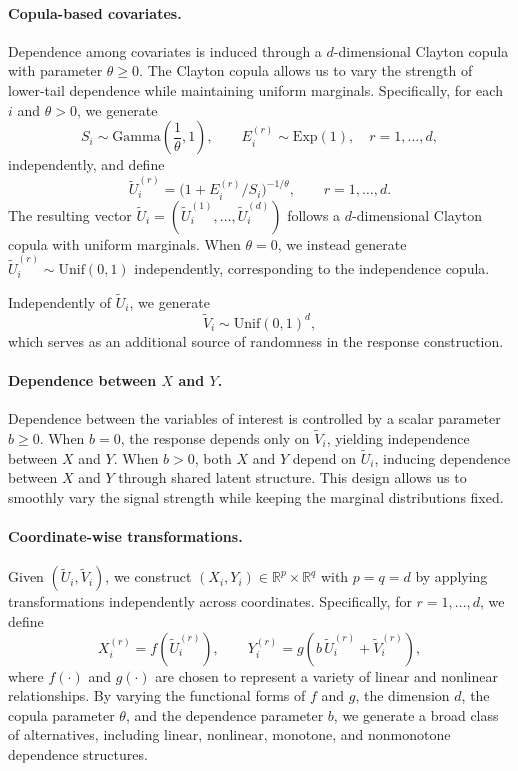 \documentclass[12pt,reqno,oneside]{amsbook}
\theoremstyle{definition}
\theoremstyle{remark}
\begin{document}
\paragraph{Copula-based covariates.}
Dependence among covariates is induced through a $d$-dimensional Clayton copula
with parameter $\theta\ge0$. The Clayton copula allows us to vary the strength of
lower-tail dependence while maintaining uniform marginals. Specifically, for
each $i$ and $\theta>0$, we generate
\[
S_i \sim \mathrm{Gamma}\!\left(\frac{1}{\theta},1\right),
\qquad
E_i^{(r)} \sim \mathrm{Exp}(1), \quad r=1,\ldots,d,
\]
independently, and define
\[
\tilde U_i^{(r)}
=
\bigl(1+E_i^{(r)}/S_i\bigr)^{-1/\theta},
\qquad r=1,\ldots,d.
\]
The resulting vector $\tilde U_i=(\tilde U_i^{(1)},\ldots,\tilde U_i^{(d)})$
follows a $d$-dimensional Clayton copula with uniform marginals. When $\theta=0$,
we instead generate $\tilde U_i^{(r)}\sim\mathrm{Unif}(0,1)$ independently,
corresponding to the independence copula.

Independently of $\tilde U_i$, we generate
\[
\tilde V_i \sim \mathrm{Unif}(0,1)^d,
\]
which serves as an additional source of randomness in the response
construction.

\paragraph{Dependence between $X$ and $Y$.}
Dependence between the variables of interest is controlled by a scalar parameter
$b\ge0$. When $b=0$, the response depends only on $\tilde V_i$, yielding
independence between $X$ and $Y$. When $b>0$, both $X$ and $Y$ depend on $\tilde
U_i$, inducing dependence between $X$ and $Y$ through shared latent structure.
This design allows us to smoothly vary the signal strength while keeping the
marginal distributions fixed.

\paragraph{Coordinate-wise transformations.}
Given $(\tilde U_i,\tilde V_i)$, we construct $(X_i,Y_i)\in\mathbb{R}^p\times
\mathbb{R}^q$ with $p=q=d$ by applying transformations independently across
coordinates. Specifically, for $r=1,\ldots,d$, we define
\[
X_i^{(r)} = f\!\left(\tilde U_i^{(r)}\right),
\qquad
Y_i^{(r)} = g\!\left(b\,\tilde U_i^{(r)} + \tilde V_i^{(r)}\right),
\]
where $f(\cdot)$ and $g(\cdot)$ are chosen to represent a variety of linear and
nonlinear relationships. By varying the functional forms of $f$ and $g$, the
dimension $d$, the copula parameter $\theta$, and the dependence parameter $b$,
we generate a broad class of alternatives, including linear, nonlinear,
monotone, and nonmonotone dependence structures.
\end{document}
